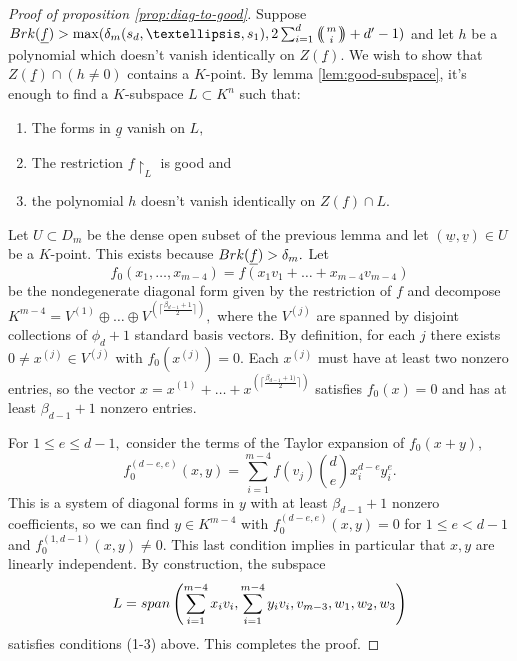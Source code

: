 \documentclass[10pt,a4paper]{amsart}
\let\ul\underline
\theoremstyle{definition}
\def\multiset#1#2{\ensuremath{\left(\kern-.3em\left(\genfrac{}{}{0pt}{}{#1}{#2}\right)\kern-.3em\right)}}
\renewcommand{\sp}{\textnormal{span}}
\newcommand{\brk}{\textnormal{Brk}}
\begin{document}
    \begin{proof}[Proof of proposition \ref{prop:diag-to-good}]

    Suppose $\brk(\ul{f}) > \max(\delta_m(s_d,\ldots,s_1), 2\sum_{i=1}^d\multiset{m}{i}+d'-1) $ and let $h$ be a polynomial which doesn't vanish identically on $Z(\ul{f}).$ We wish to show that $Z(\ul{f})\cap (h\neq 0)$ contains a $K$-point. By lemma \ref{lem:good-subspace}, it's enough to find a $K$-subspace $L\subset K^n$ such that: 
    \begin{enumerate}
        \item The forms in $\ul{g}$ vanish on $L,$
        \item The restriction $f\restriction_L$ is good and
        \item the polynomial $h$ doesn't vanish identically on $Z(f)\cap L.$
    \end{enumerate}
    
    Let $U\subset D_m$ be the dense open subset of the previous lemma and let  $(\ul{w},\ul{v})\in U$ be a $K$-point. This exists because $\brk(\ul{f}) > \delta_m.$ Let 
    $$ f_0(x_1,\ldots,x_{m-4}) = f(x_1v_1+\ldots+x_{m-4}v_{m-4})$$
    be the nondegenerate diagonal form given by the restriction of $f$ and decompose $K^{m-4} = V^{(1)}\oplus\ldots\oplus V^{(\lceil\frac{\beta_{d-1}+1}{2}\rceil)},$ where the $V^{(j)}$ are spanned by disjoint collections of $\phi_d+1$ standard basis vectors. By definition, for each $j$ there exists $0\neq x^{(j)}\in V^{(j)}$ with $f_0(x^{(j)}) = 0.$ Each $x^{(j)}$ must have at least two nonzero entries, so the vector $x = x^{(1)}+\ldots+x^{\left( \lceil\frac{\beta_{d-1}+1)}{2}\rceil \right)}$ satisfies $f_0(x) = 0$ and has at least $\beta_{d-1}+1$ nonzero entries.

    For $1\le e \le d-1,$ consider the terms of the Taylor expansion of $f_0(x+y),$
        \[
        f_0^{(d-e,e)}(x,y) =   \sum_{i=1}^{m-4} f(v_j) \binom{d}{e}  x_i^{d-e} y_i^e.
        \]
    This is a system of diagonal forms in $y$ with at least $\beta_{d-1}+1$ nonzero coefficients, so we can find $y\in K^{m-4}$ with $f_0^{(d-e,e)}(x,y)  = 0$ for $1\le e< d-1$ and $f_0^{(1,d-1)} (x,y) \neq 0.$ This last condition implies in particular that $x,y$ are linearly independent. By construction, the subspace
    \[
    L = \sp\left(\sum_{i=1}^{m-4} x_iv_i, \sum_{i=1}^{m-4} y_iv_i ,  v_{m-3}, w_1,w_2,w_3 \right) 
    \]
    satisfies conditions (1-3) above. This completes the proof.
\end{proof}
\end{document}
